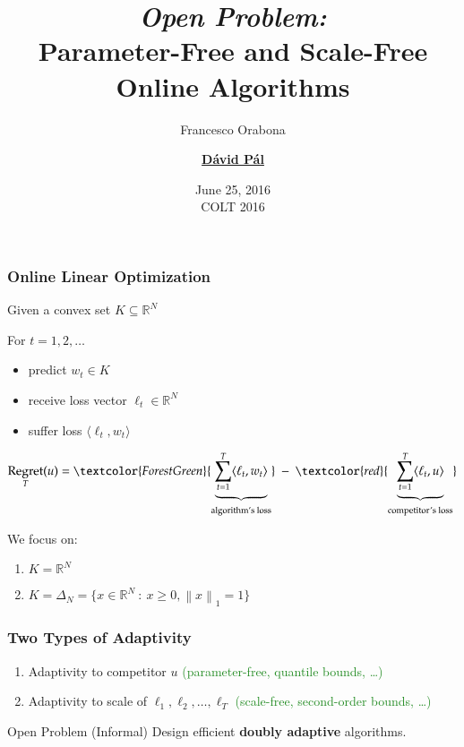 \documentclass[usenames,dvipsnames]{beamer}
\title{\emph{Open Problem:} \\ Parameter-Free and Scale-Free \\ Online Algorithms}
\date{June 25, 2016 \\ \vspace{1cm} \tiny COLT 2016}
\author{Francesco Orabona \and \underline{\textbf{D\'avid P\'al}}}
\institute{Yahoo Research, New York}
\DeclareMathOperator{\Regret}{Regret}
\newcommand{\R}{\mathbb{R}}
\newcommand{\norm}[1]{\left\|#1\right\|}
\begin{document}
\begin{frame}
\maketitle
\end{frame}

\begin{frame}
\frametitle{Online Linear Optimization}

Given a convex set $K \subseteq \R^N$

\vspace{0.3cm}

For $t=1,2,\dots$
\begin{itemize}
\item predict $w_t \in K$
\item receive loss vector $\ell_t \in \R^N$
\item suffer loss $\langle \ell_t, w_t \rangle$
\end{itemize}

\vspace{0.3cm}
$$
\Regret_T(u) = \textcolor{ForestGreen}{\underbrace{\sum_{t=1}^T \langle \ell_t, w_t \rangle}_{\text{algorithm's loss}}} \ - \ \textcolor{red}{\underbrace{\sum_{t=1}^T \langle \ell_t, u \rangle}_{\text{competitor's loss}}}
$$

\vspace{0.3cm}

We focus on:
\begin{enumerate}
\item $K = \R^N$
\item $K = \Delta_N = \{ x \in \R^N ~:~ x \ge 0, \norm{x}_1 = 1 \}$
\end{enumerate}

\end{frame}

\begin{frame}
\frametitle{Two Types of Adaptivity}

\begin{enumerate}
\item Adaptivity to competitor $u$ \qquad \textcolor{ForestGreen}{\tiny (parameter-free, quantile bounds, \dots)}
\item Adaptivity to scale of $\ell_1, \ell_2, \dots, \ell_T$ \quad \textcolor{ForestGreen}{\tiny (scale-free, second-order bounds, \dots)}
\end{enumerate}

\vspace{1cm}

\begin{block}{Open Problem (Informal)}
Design efficient \textbf{doubly adaptive} algorithms.
\end{block}

\end{frame}
\end{document}
